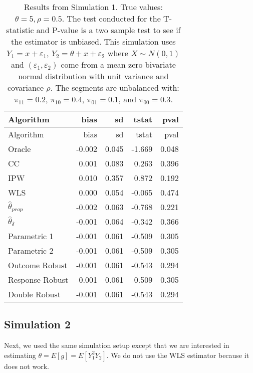 \documentclass[
  letterpaper,
  DIV=11,
  numbers=noendperiod]{scrartcl}
\begin{document}
\hypertarget{tbl-sim1}{}
\begin{longtable}[]{@{}lrrrr@{}}
\caption{\label{tbl-sim1}Results from Simulation 1. True values:
\(\theta = 5, \rho = 0.5\). The test conducted for the T-statistic and
P-value is a two sample test to see if the estimator is unbiased. This
simulation uses \(Y_1 = x + \varepsilon_1\),
\(Y_2 = \theta + x + \varepsilon_2\) where \(X \sim N(0, 1)\) and
\((\varepsilon_1, \varepsilon_2)\) come from a mean zero bivariate
normal distribution with unit variance and covariance \(\rho\). The
segments are unbalanced with: \(\pi_{11} = 0.2\), \(\pi_{10} = 0.4\),
\(\pi_{01} = 0.1\), and \(\pi_{00} = 0.3\).}\tabularnewline
\toprule\noalign{}
Algorithm & bias & sd & tstat & pval \\
\midrule\noalign{}
\endfirsthead
\toprule\noalign{}
Algorithm & bias & sd & tstat & pval \\
\midrule\noalign{}
\endhead
\bottomrule\noalign{}
\endlastfoot
Oracle & -0.002 & 0.045 & -1.669 & 0.048 \\
CC & 0.001 & 0.083 & 0.263 & 0.396 \\
IPW & 0.010 & 0.357 & 0.872 & 0.192 \\
WLS & 0.000 & 0.054 & -0.065 & 0.474 \\
\(\hat \theta_{prop}\) & -0.002 & 0.063 & -0.768 & 0.221 \\
\(\hat \theta_{\delta}\) & -0.001 & 0.064 & -0.342 & 0.366 \\
Parametric 1 & -0.001 & 0.061 & -0.509 & 0.305 \\
Parametric 2 & -0.001 & 0.061 & -0.509 & 0.305 \\
Outcome Robust & -0.001 & 0.061 & -0.543 & 0.294 \\
Response Robust & -0.001 & 0.061 & -0.509 & 0.305 \\
Double Robust & -0.001 & 0.061 & -0.543 & 0.294 \\
\end{longtable}

\hypertarget{simulation-2}{%
\subsection*{Simulation 2}\label{simulation-2}}

Next, we used the same simulation setup except that we are interested in
estimating \(\theta = E[g] = E[Y_1^2 Y_2]\). We do not use the WLS
estimator because it does not work.
\end{document}
